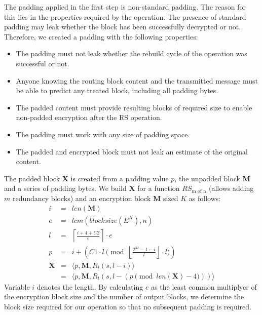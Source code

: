 The padding applied in the first step is non-standard padding. The reason for this lies in the properties required by the operation. The presence of standard padding may leak whether the block has been successfully decrypted or not. Therefore, we created a padding with the following properties:
\begin{itemize}
	\item The padding must not leak whether the rebuild cycle of the operation was successful or not.
	\item Anyone knowing the routing block content and the transmitted message must be able to predict any treated block, including all padding bytes.
	\item The padded content must provide resulting blocks of required size to enable non-padded encryption after the RS operation.
	\item The padding must work with any size of padding space.
	\item The padded and encrypted block must not leak an estimate of the original content.
\end{itemize}

The padded block $\mathbf{X}$ is created from a padding value $p$, the unpadded block $\mathbf{M}$ and a series of padding bytes. We build $\mathbf{X}$ for a function $RS_{\text{m of n}}$ (allows adding $m$ redundancy blocks) and an encryption block $\mathbf{M}$ sized $K$ as follows:
\begin{eqnarray}
	i          & = & len(\mathbf{M}) \label{eqn:sizeOrigMsg}\\
	e          & = & lcm\left(blocksize\left(E^{K}\right), n\right) \label{eqn:sizeOfOpBlock}\\
	l          & = & \left\lceil\frac{i + 4 + C2 }{e}\right\rceil\cdot e \label{eqn:sizeOfPaddedBlock}\\
	p          & = & i + \left( C1 \cdot l \pmod{\left\lfloor\frac{2^{32}-1-i}{l}\right\rfloor\cdot l}\right)\\
	\mathbf{X} & = & \langle p,\mathbf{M},R_{t}\left(s,l-i\right)\rangle\\\nonumber
	& = & \langle p,\mathbf{M},R_{t}\left(s,l-\left(p \pmod{len\left(\mathbf{X}\right)-4}\right)\right)\rangle
\end{eqnarray}    
Variable $i$ denotes the length. By calculating $e$ as the least common multiplyer of the encryption block size and the number of output blocks, we determine the block size required for our operation so that no subsequent padding is required.


